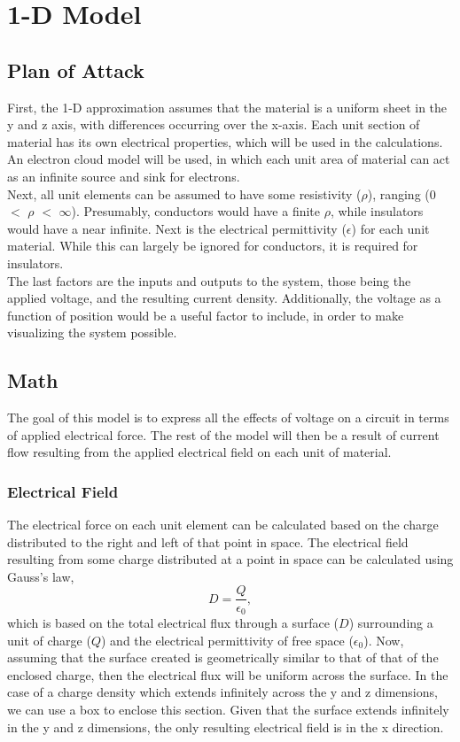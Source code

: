 \documentclass[conference]{IEEEtran}
\begin{document}
	\section{1-D Model}
	\subsection{Plan of Attack}
	First, the 1-D approximation assumes that the material is a uniform sheet in the y and z axis, with differences occurring over the x-axis. Each unit section of material has its own electrical properties, which will be used in the calculations. \\
	
	An electron cloud model will be used, in which each unit area of material can act as an infinite source and sink for electrons. \\
	
	Next, all unit elements can be assumed to have some resistivity ($\rho$), ranging (0 $<$ $\rho$ $<$ $\infty$). Presumably, conductors would have a finite $\rho$, while insulators would have a near infinite. Next is the electrical permittivity ($\epsilon$) for each unit material. While this can largely be ignored for conductors, it is required for insulators. \\
	
	The last factors are the inputs and outputs to the system, those being the applied voltage, and the resulting current density. Additionally, the voltage as a function of position would be a useful factor to include, in order to make visualizing the system possible.
	
	\subsection{Math}
	The goal of this model is to express all the effects of voltage on a circuit in terms of applied electrical force. The rest of the model will then be a result of current flow resulting from the applied electrical field on each unit of material.
	
	\subsubsection{Electrical Field}
	The electrical force on each unit element can be calculated based on the charge distributed to the right and left of that point in space. The electrical field resulting from some charge distributed at a point in space can be calculated using Gauss's law,
	\begin{equation}
	D = \frac{Q}{\epsilon_0},
	\end{equation}
	which is based on the total electrical flux through a surface ($D$) surrounding a unit of charge ($Q$) and the electrical permittivity of free space ($\epsilon_0$). Now, assuming that the surface created is geometrically similar to that of that of the enclosed charge, then the electrical flux will be uniform across the surface. In the case of a charge density which extends infinitely across the y and z dimensions, we can use a box to enclose this section. Given that the surface extends infinitely in the y and z dimensions, the only resulting electrical field is in the x direction.
	
\end{document}
